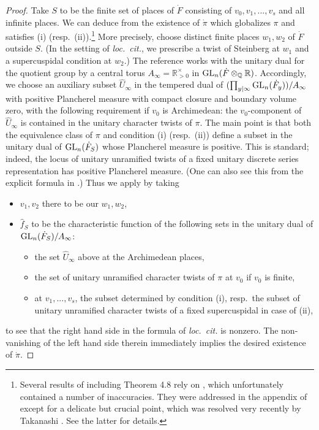 \documentclass[11pt,reqno]{amsart}
\theoremstyle{plain}
\theoremstyle{definition}
\newcommand{\Q}{\mathbb{Q}}
\newcommand{\R}{\mathbb{R}}
\newcommand{\GL}{\tu{GL}}
\newcommand{\tu}{\textup}
\renewcommand{\hat}{\widehat}
\numberwithin{equation}{subsection}
\begin{document}
\begin{proof}
Take $S$ to be the finite set of places of $\dot F$ consisting of $v_0, v_1,...,v_s$ and all infinite places. We can deduce from \cite[Thm.~4.8]{Shi12} the existence of $\dot \pi$ which globalizes $\pi$ and satisfies (i) (resp.~(ii)).\footnote{Several results of \cite{Shi12} including Theorem 4.8 rely on \cite{Sauvageot}, which unfortunately contained a number of inaccuracies. They were addressed in the appendix of \cite{Shi12} except for a delicate but crucial point, which was resolved very recently by Takanashi \cite{TakanashiDensity}. See the latter for details.}
More precisely, choose distinct finite places $w_1,w_2$ of $\dot F$ outside $S$. (In the setting of \emph{loc.~cit.}, we prescribe a twist of Steinberg at $w_1$ and a supercuspidal condition at $w_2$.) The reference works with the unitary dual for the quotient group by a central torus $A_{\infty}=\R^\times_{>0}$ in $\GL_n(\dot F\otimes_{\Q}\R)$. Accordingly, we choose an auxiliary subset $\hat U_\infty$ in the tempered dual of $(\prod_{y|\infty}\GL_n(\dot F_y))/A_{\infty}$ with positive Plancherel measure with compact closure and boundary volume zero, with the following requirement if $v_0$ is Archimedean: the $v_0$-component of $\hat U_\infty$ is contained in the unitary character twists of $\pi$. The main point is that both the equivalence class of $\pi$ and condition (i) (resp.~(ii)) define a subset in the unitary dual of $\GL_n(\dot F_S)$ whose Plancherel measure is positive. This is standard; indeed, the locus of unitary unramified twists of a fixed unitary discrete series representation has positive Plancherel measure. (One can also see this from the explicit formula in \cite[\S5]{AubertPlymen}.)
Thus we apply \cite[Thm.~4.8]{Shi12} by taking
\begin{itemize}
    \item $v_1,v_2$ there to be our $w_1,w_2$,
    \item $\hat f_S$ to be the characteristic function of the following sets in the unitary dual of $\GL_n(\dot F_S)/A_{\infty}$:
    \begin{itemize}
    \item the set $\hat U_\infty$ above at the Archimedean places, 
    \item the set of unitary unramified character twists of $\pi$ at $v_0$ if $v_0$ is finite,
        \item at $v_1,...,v_s$, the subset determined by condition (i), resp.~the subset of unitary unramified character twists of a fixed supercuspidal in case of (ii),
    \end{itemize}
\end{itemize}
to see that the right hand side in the formula of \emph{loc.~cit.} is nonzero. The non-vanishing of the left hand side therein immediately implies the desired existence of $\dot \pi$.
\end{proof}
\end{document}
